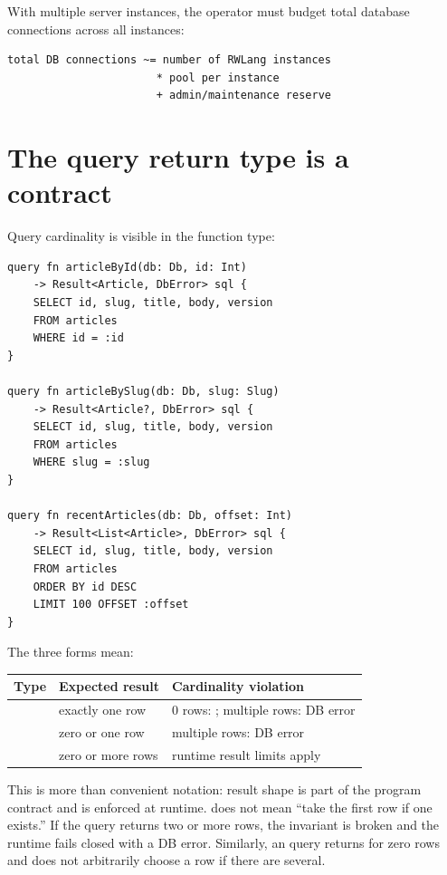 With multiple server instances, the operator must budget total database connections across all instances:

\begin{lstlisting}
total DB connections ~= number of RWLang instances
                       * pool per instance
                       + admin/maintenance reserve
\end{lstlisting}

\section{The query return type is a contract}

Query cardinality is visible in the function type:

\begin{lstlisting}[language=RWLang]
query fn articleById(db: Db, id: Int)
    -> Result<Article, DbError> sql {
    SELECT id, slug, title, body, version
    FROM articles
    WHERE id = :id
}

query fn articleBySlug(db: Db, slug: Slug)
    -> Result<Article?, DbError> sql {
    SELECT id, slug, title, body, version
    FROM articles
    WHERE slug = :slug
}

query fn recentArticles(db: Db, offset: Int)
    -> Result<List<Article>, DbError> sql {
    SELECT id, slug, title, body, version
    FROM articles
    ORDER BY id DESC
    LIMIT 100 OFFSET :offset
}
\end{lstlisting}

The three forms mean:

\begin{center}
\begin{tabularx}{\textwidth}{@{}L{0.23\textwidth}YY@{}}
\toprule
Type & Expected result & Cardinality violation \\
\midrule
{} & exactly one row & 0 rows: ; multiple rows: DB error \\
 & zero or one row & multiple rows: DB error \\
 & zero or more rows & runtime result limits apply \\
\bottomrule
\end{tabularx}
\end{center}

This is more than convenient notation: result shape is part of the program contract and is enforced at runtime.  does not mean ``take the first row if one exists.'' If the query returns two or more rows, the invariant is broken and the runtime fails closed with a DB error. Similarly, an  query returns  for zero rows and does not arbitrarily choose a row if there are several.

